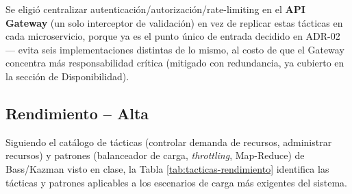 \documentclass[12pt,a4paper]{article}
\begin{document}
Se eligió centralizar autenticación/autorización/rate-limiting en el \textbf{API Gateway} (un solo
interceptor de validación) en vez de replicar estas tácticas en cada microservicio, porque ya es el
punto único de entrada decidido en ADR-02 — evita seis implementaciones distintas de lo mismo, al
costo de que el Gateway concentra más responsabilidad crítica (mitigado con redundancia, ya
cubierto en la sección de Disponibilidad).

\subsection{Rendimiento -- Alta}

Siguiendo el catálogo de tácticas (controlar demanda de recursos, administrar recursos) y patrones
(balanceador de carga, \textit{throttling}, Map-Reduce) de Bass/Kazman visto en clase, la Tabla
\ref{tab:tacticas-rendimiento} identifica las tácticas y patrones aplicables a los escenarios de
carga más exigentes del sistema.
\end{document}
